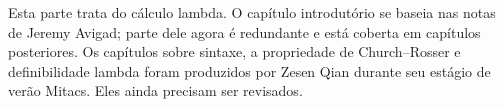\documentclass[../../include/open-logic-part]{subfiles}
\begin{document}

\begin{editorial}
Esta parte trata do cálculo lambda. O capítulo introdutório se baseia nas
notas de Jeremy Avigad; parte dele agora é redundante e está coberta em
capítulos posteriores. Os capítulos sobre sintaxe, a propriedade de
Church--Rosser e definibilidade lambda foram produzidos por Zesen Qian
durante seu estágio de verão Mitacs. Eles ainda precisam ser revisados.
\end{editorial}





\OLEndPartHook
\end{document}
